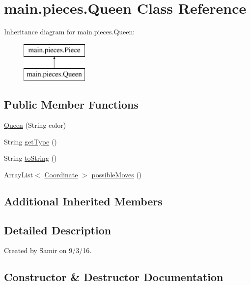 \hypertarget{classmain_1_1pieces_1_1_queen}{}\section{main.\+pieces.\+Queen Class Reference}
\label{classmain_1_1pieces_1_1_queen}
Inheritance diagram for main.\+pieces.\+Queen\+:\begin{figure}[H]
\begin{center}
\leavevmode
\includegraphics[height=2.000000cm]{classmain_1_1pieces_1_1_queen}
\end{center}
\end{figure}
\subsection*{Public Member Functions}
\begin{DoxyCompactItemize}
\item 
\hyperlink{classmain_1_1pieces_1_1_queen_ac013f2c9aa2e24f6633d41711a83ff1e}{Queen} (String color)
\item 
String \hyperlink{classmain_1_1pieces_1_1_queen_a7964928ca1ea3ecfaa04d80dc5764d5b}{get\+Type} ()
\item 
String \hyperlink{classmain_1_1pieces_1_1_queen_a87b715eb4a56c840d1e1830264d23a56}{to\+String} ()
\item 
Array\+List$<$ \hyperlink{classmain_1_1model_1_1_coordinate}{Coordinate} $>$ \hyperlink{classmain_1_1pieces_1_1_queen_a8791ac2f814bb5d3791c7787e2714b9e}{possible\+Moves} ()
\end{DoxyCompactItemize}
\subsection*{Additional Inherited Members}


\subsection{Detailed Description}
Created by Samir on 9/3/16. 

\subsection{Constructor \& Destructor Documentation}
\hypertarget{classmain_1_1pieces_1_1_queen_ac013f2c9aa2e24f6633d41711a83ff1e}{}\label{classmain_1_1pieces_1_1_queen_ac013f2c9aa2e24f6633d41711a83ff1e} 
